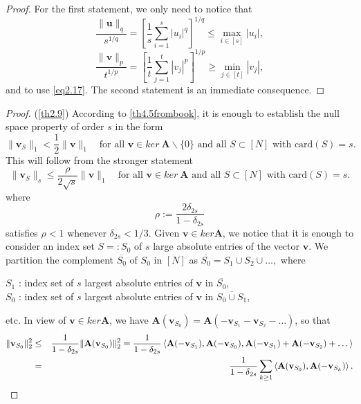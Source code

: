 \begin{proof}
    For the first statement, we only need to notice that
    \[
        \frac{\|\mathbf{u}\|_q}{s^{1/q}} = \left[ \frac{1}{s}\sum\limits_{i=1}^s \left|u_i\right|^q \right]^{1/q} \leq \max\limits_{i \in [s]}\left|u_i\right|,
    \]
    \[
        \frac{\|\mathbf{v}\|_p}{t^{1/p}} = \left[ \frac{1}{t} \sum\limits_{j=1}^t \left|v_j\right|^p \right]^{1/p} \geq \min\limits_{j \in [t]} \left|v_{j}\right|,
    \]
    and to use \cref{eq2.17}. The second statement is an immediate consequence.
\end{proof}



\begin{proof} {(\cref{th2.9})}
    According to \cref{th4.5frombook}, it is enough to establish the null space property of order $s$ in the form
    \[
        \|\mathbf{v}_S\|_1 < \frac{1}{2}\|\mathbf{v}\|_1 \quad \text{for all } \mathbf{v} \in ker\ \mathbf{A} \backslash \{0\} \text{ and all } S\subset [N] \text{ with card}(S)=s.
    \]
    This will follow from the stronger statement
    \[
        \|\mathbf{v}_S\|_s \leq \frac{\rho}{2 \sqrt{s}}\|\mathbf{v}\|_1 \quad \text{for all } \mathbf{v} \in ker\ \mathbf{A} \text{ and all } S\subset [N] \text{ with card}(S)=s.
    \]
    where
    \[
        \rho := \frac{2 \delta_{2s}}{1- \delta_{2s}}
    \]
    satisfies $\rho<1$ whenever $\delta_{2s} < 1/3$. Given $\mathbf{v} \in ker\mathbf{A}$, we notice that it is enough to consider an index set $S =: S_0$ of $s$ large absolute entries of the vector $\mathbf{v}$. We partition the complement $\overline{S_0}$ of $S_0$ in $[N]$ as $\overline{S_0} = S_1 \cup S_2 \cup \dots,$ where
    \begin{center}
        $S_1$ : index set of $s$ largest absolute entries of $\mathbf{v}$ in $\overline{S_0}$,\\
        $S_0$ : index set of $s$ largest absolute entries of $\mathbf{v}$ in $\overline{S_0 \cup S_1}$,
    \end{center}
    etc. In view of $\mathbf{v} \in ker\mathbf{A}$, we have $\mathbf{A}(\mathbf{v}_{S_0}) = \mathbf{A}(-\mathbf{v}_{S_1}-\mathbf{v}_{S_2}-\dots)$, so that 
    \begin{eqnarray}
        \|\mathbf{v}_{S_0}\|_2^2 &\leq& \frac{1}{1-\delta_{2s}} \|\mathbf{A}(\mathbf{v}_{S_0})\|_2^2 = \frac{1}{1-\delta_{2s}}\left<\mathbf{A}(-\mathbf{v}_{S_1}), \mathbf{A}(-\mathbf{v}_{S_0}), \mathbf{A}(-\mathbf{v}_{S_1}) + \mathbf{A}(-\mathbf{v}_{S_2})+\dots\right> \notag \\
        &=& \frac{1}{1-\delta_{2s}} \sum\limits_{k \geq 1}\left<\mathbf{A}(\mathbf{v}_{S_0}), \mathbf{A}(-\mathbf{v}_{S_k})\right>.

\end{eqnarray}
\end{proof}
